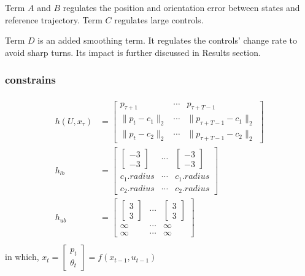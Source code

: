 \documentclass[conference]{IEEEtran}
\begin{document}
Term $A$ and $B$ regulates the position and orientation error 
between states and reference trajectory.
Term $C$ regulates large controls.

Term $D$ is an added smoothing term.
It regulates the controls' change rate to avoid sharp turns.
Its impact is further discussed in Results section.

\subsubsection{constrains}
\[
\begin{gathered}
\begin{aligned}
h(U, x_\tau)&=\left[ \begin{matrix}p_{\tau +1}&\cdots &p_{\tau +T-1}\\ \| p_{t}-c_{1}\|_{2} &\cdots &\| p_{\tau +T-1}-c_{1}\|_{2} \\ \| p_{t}-c_{2}\|_{2} &\cdots &\| p_{\tau +T-1}-c_{2}\|_2 \end{matrix}  \right] \\ 
h_{lb}&=\left[ \begin{matrix}\left[ \begin{gathered}-3\\ -3 \end{gathered}  \right] &\cdots &\left[ \begin{gathered}-3\\ -3 \end{gathered}  \right] \\ c_{1}.radius&\cdots &c_{1}.radius\\ c_{2}.radius&\cdots &c_{2}.radius\end{matrix}  \right] \\ 
h_{ub}&=\left[ \begin{matrix}\left[ \begin{gathered} 3\\  3 \end{gathered}  \right] &\cdots &\left[ \begin{gathered} 3\\  3 \end{gathered}  \right] \\ \infty&\cdots &\infty\\ \infty&\cdots &\infty\end{matrix}  \right] 
\end{aligned} \\
\end{gathered} 
\]
in which, 
\( x_{t} = \left[ \begin{gathered}p_{t}\\ \theta_{t} \end{gathered}  \right]  
=f(x_{t-1},u_{t-1}) \)
\end{document}
